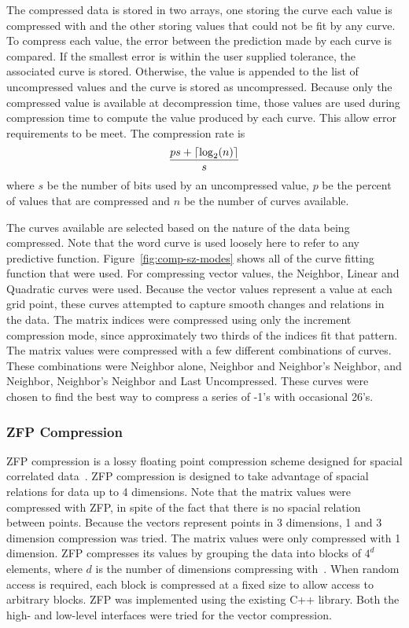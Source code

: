 The compressed data is stored in two arrays, one storing the curve each value is compressed with and the other storing values that could not be fit by any curve.
To compress each value, the error between the prediction made by each curve is compared.
If the smallest error is within the user supplied tolerance, the associated curve is stored.
Otherwise, the value is appended to the list of uncompressed values and the curve is stored as uncompressed.
Because only the compressed value is available at decompression time, those values are used during compression time to compute the value produced by each curve.
This allow error requirements to be meet.
The compression rate is
\[
	\frac{ps+\lceil\log_2(n)\rceil}{s}
\]
where \(s\) be the number of bits used by an uncompressed value, \(p\) be the percent of values that are compressed and \(n\) be the number of curves available.



The curves available are selected based on the nature of the data being compressed.
Note that the word curve is used loosely here to refer to any predictive function.
Figure~\ref{fig:comp-sz-modes} shows all of the curve fitting function that were used.
For compressing vector values, the Neighbor, Linear and Quadratic curves were used.
Because the vector values represent a value at each grid point, these curves attempted to capture smooth changes and relations in the data.
The matrix indices were compressed using only the increment compression mode, since approximately two thirds of the indices fit that pattern.
The matrix values were compressed with a few different combinations of curves.
These combinations were Neighbor alone, Neighbor and Neighbor's Neighbor, and Neighbor, Neighbor's Neighbor and Last Uncompressed.
These curves were chosen to find the best way to compress a series of -1's with occasional 26's.

\subsubsection{ZFP Compression}
ZFP compression is a lossy floating point compression scheme designed for spacial correlated data~\cite{Lindstrom:2014:zfp}.
ZFP compression is designed to take advantage of spacial relations for data up to 4 dimensions.
Note that the matrix values were compressed with ZFP, in spite of the fact that there is no spacial relation between points.
Because the vectors represent points in 3 dimensions, 1 and 3 dimension compression was tried.
The matrix values were only compressed with 1 dimension.
ZFP compresses its values by grouping the data into blocks of \(4^d\) elements, where \(d\) is the number of dimensions compressing with~\cite{Lindstrom:2014:zfp}.
When random access is required, each block is compressed at a fixed size to allow access to arbitrary blocks.
ZFP was implemented using the existing C++ library.
Both the high- and low-level interfaces were tried for the vector compression.


